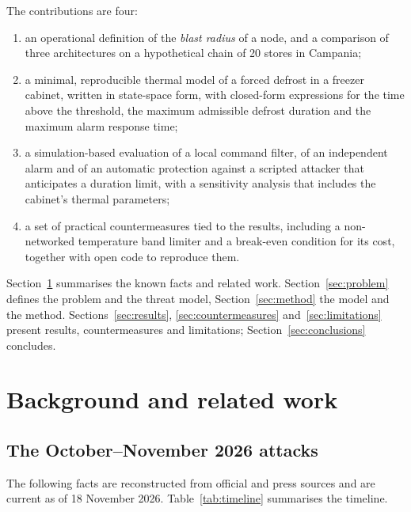 \documentclass{ceurart}
\begin{document}
The contributions are four:
\begin{enumerate}
  \item an operational definition of the \emph{blast radius} of a node, and a comparison of three architectures on a hypothetical chain of 20 stores in Campania;
  \item a minimal, reproducible thermal model of a forced defrost in a freezer cabinet, written in state-space form, with closed-form expressions for the time above the threshold, the maximum admissible defrost duration and the maximum alarm response time;
  \item a simulation-based evaluation of a local command filter, of an independent alarm and of an automatic protection against a scripted attacker that anticipates a duration limit, with a sensitivity analysis that includes the cabinet's thermal parameters;
  \item a set of practical countermeasures tied to the results, including a non-networked temperature band limiter and a break-even condition for its cost, together with open code to reproduce them.
\end{enumerate}

Section~\ref{sec:background} summarises the known facts and related work.
Section~\ref{sec:problem} defines the problem and the threat model, Section~\ref{sec:method} the model and the method.
Sections~\ref{sec:results}, \ref{sec:countermeasures} and~\ref{sec:limitations} present results, countermeasures and limitations; Section~\ref{sec:conclusions} concludes.

\section{Background and related work}
\label{sec:background}

\subsection{The October--November 2026 attacks}

The following facts are reconstructed from official and press sources and are current as of 18 November 2026.
Table~\ref{tab:timeline} summarises the timeline.
\end{document}
